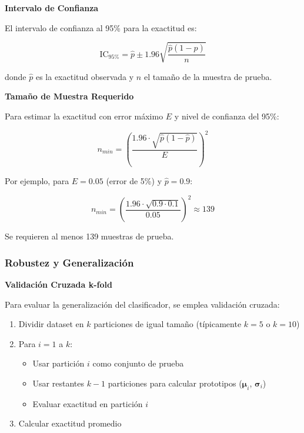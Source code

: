 \textbf{Intervalo de Confianza}

El intervalo de confianza al 95\% para la exactitud es:

\begin{equation}
\text{IC}_{95\%} = \hat{p} \pm 1.96\sqrt{\frac{\hat{p}(1-\hat{p})}{n}}
\end{equation}

donde $\hat{p}$ es la exactitud observada y $n$ el tamaño de la muestra de prueba.

\textbf{Tamaño de Muestra Requerido}

Para estimar la exactitud con error máximo $E$ y nivel de confianza del 95\%:

\begin{equation}
n_{min} = \left(\frac{1.96 \cdot \sqrt{\hat{p}(1-\hat{p})}}{E}\right)^2
\end{equation}

Por ejemplo, para $E = 0.05$ (error de 5\%) y $\hat{p} = 0.9$:

\begin{equation}
n_{min} = \left(\frac{1.96 \cdot \sqrt{0.9 \cdot 0.1}}{0.05}\right)^2 \approx 139
\end{equation}

Se requieren al menos 139 muestras de prueba.

\subsubsection{Robustez y Generalización}

\textbf{Validación Cruzada k-fold}

Para evaluar la generalización del clasificador, se emplea validación cruzada:

\begin{enumerate}
\item Dividir dataset en $k$ particiones de igual tamaño (típicamente $k=5$ o $k=10$)
\item Para $i = 1$ a $k$:
   \begin{itemize}
   \item Usar partición $i$ como conjunto de prueba
   \item Usar restantes $k-1$ particiones para calcular prototipos ($\boldsymbol{\mu}_i$, $\boldsymbol{\sigma}_i$)
   \item Evaluar exactitud en partición $i$
   \end{itemize}
\item Calcular exactitud promedio
\end{enumerate}

